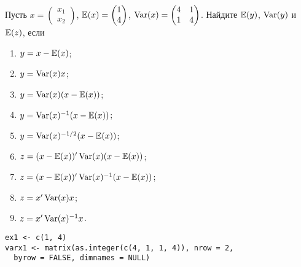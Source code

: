 \begin{problem}
Пусть  $x = \begin{pmatrix} x_1 \\ x_2 \end{pmatrix}$, $\mathbb{E}(x) = \begin{pmatrix} 1 \\ 4 \end{pmatrix}$, $\operatorname{Var}(x) = \begin{pmatrix} 4 & 1 \\ 1 & 4 \end{pmatrix}$. Найдите $\mathbb{E}(y)$, $\operatorname{Var}(y)$ и $\mathbb{E}(z)$, если
\begin{enumerate}
\item $y = x - \mathbb{E}(x)$;
\item $y = \operatorname{Var}(x)x$;
\item $y = \operatorname{Var}(x)(x - \mathbb{E}(x))$;
\item $y = \operatorname{Var}(x)^{-1}(x - \mathbb{E}(x))$;
\item $y = \operatorname{Var}(x)^{-1/2}(x - \mathbb{E}(x))$;
\item $z = (x - \mathbb{E}(x))'\operatorname{Var}(x)(x - \mathbb{E}(x))$;
\item $z = (x - \mathbb{E}(x))'\operatorname{Var}(x)^{-1}(x - \mathbb{E}(x))$;
\item $z = x'\operatorname{Var}(x)x$;
\item $z = x'\operatorname{Var}(x)^{-1}x$.
\end{enumerate}


\begin{sol}
\begin{verbatim}
ex1 <- c(1, 4)
varx1 <- matrix(as.integer(c(4, 1, 1, 4)), nrow = 2,
  byrow = FALSE, dimnames = NULL)
\end{verbatim}

\end{sol}
\end{problem}




